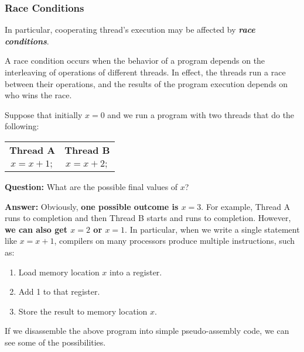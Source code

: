 \documentclass{article}
\begin{document}
\subsubsection{Race Conditions}
In particular, cooperating thread's execution may be affected by \textbf{\textit{race conditions}}.
\begin{definition}
    A race condition occurs when the behavior of a program depends on the interleaving of operations of different threads. In effect, the threads run a race between their operations, and the results of the program execution depends on who wins the race.
\end{definition}

\begin{example}
    Suppose that initially \( x = 0 \) and we run a program with two threads that do the following:

    \begin{center}
        \begin{tabular}{c c}
            \textbf{Thread A} & \textbf{Thread B} \\
            $x = x + 1;$      & $x = x + 2;$      \\
        \end{tabular}
    \end{center}

    \noindent
    \textbf{Question:} What are the possible final values of \( x \)?

    \noindent
    \textbf{Answer:} Obviously, \textbf{one possible outcome is \( x = 3 \)}. For example, Thread A runs to completion and then Thread B starts and runs to completion. However, \textbf{we can also get \( x = 2 \) or \( x = 1 \)}. In particular, when we write a single statement like \( x = x + 1 \), compilers on many processors produce multiple instructions, such as:
    \begin{enumerate}
        \item Load memory location \( x \) into a register.
        \item Add 1 to that register.
        \item Store the result to memory location \( x \).
    \end{enumerate}
    If we disassemble the above program into simple pseudo-assembly code, we can see some of the possibilities.



\end{example}
\end{document}
